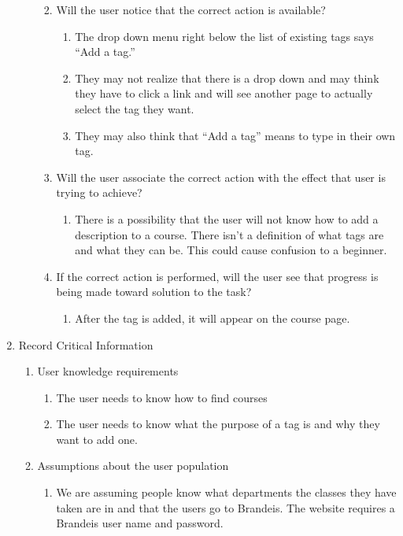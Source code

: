 \documentclass[12pt]{report}
\begin{document}
\begin{enumerate}
\begin{enumerate}
\begin{enumerate}
\begin{enumerate}
          	\end{enumerate}
        \item Will the user notice that the correct action is available?
            \begin{enumerate}
            \item The drop down menu right below the list of existing tags says “Add a tag.”
            \item They may not realize that there is a drop down and may think they have to click a link and will see another page to actually select the tag they want.
            \item They may also think that “Add a tag” means to type in their own tag. 
            \end{enumerate}
        \item Will the user associate the correct action with the effect that user is trying to achieve?
            \begin{enumerate}
            \item There is a possibility that the user will not know how to add a description to a course. There isn’t a definition of what tags are and what they can be. This could cause confusion to a beginner. 
            \end{enumerate}
        \item If the correct action is performed, will the user see that progress is being made toward solution to the task?
            \begin{enumerate}
            \item After the tag is added, it will appear on the course page. 
            \end{enumerate}
      	\end{enumerate}
   \end{enumerate}
\item Record Critical Information
	\begin{enumerate}
    \item User knowledge requirements
    	\begin{enumerate}
        \item The user needs to know how to find courses
        \item The user needs to know what the purpose of a tag is and why they want to add one. 
        \end{enumerate}
    \item Assumptions about the user population
        \begin{enumerate}
        \item We are assuming people know what departments the classes they have taken are in and that the users go to Brandeis. The website requires a Brandeis user name and password.

\end{enumerate}
\end{enumerate}
\end{enumerate}
\end{document}
